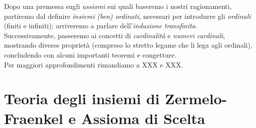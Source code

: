 Dopo una premessa sugli \textit{assiomi} sui quali baseremo i nostri ragionamenti, partiremo dal definire \textit{insiemi (ben) ordinati}, necessari per introdurre gli \textit{ordinali} (finiti e infiniti); arriveremo a parlare dell'\textit{induzione transfinita}.\\
Successivamente, passeremo ai concetti di \textit{cardinalità} e \textit{numeri cardinali}, mostrando diverse proprietà (compreso lo stretto legame che li lega agli ordinali), concludendo con alcuni importanti teoremi e congetture.\\
Per maggiori approfondimenti rimandiamo a XXX e XXX.
\section{Teoria degli insiemi di Zermelo-Fraenkel e Assioma di Scelta}
